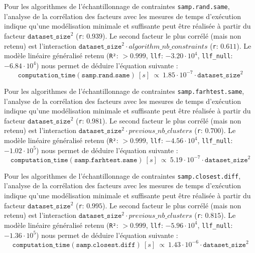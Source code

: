 			Pour les algorithmes de l'échantillonnage de contraintes \texttt{samp.rand.same}, l'analyse de la corrélation des facteurs avec les mesures de temps d'exécution indique qu'une modélisation minimale et suffisante peut être réalisée à partir du facteur $\texttt{dataset\_size}^{2}$ (\texttt{r}: $0.939$).
			Le second facteur le plus corrélé (mais non retenu) est l'interaction $\texttt{dataset\_size}^{2} \cdot algorithm\_nb\_constraints$ (\texttt{r}: $0.611$).
			Le modèle linéaire généralisé retenu (\texttt{R²}: $> 0.999$, \texttt{llf}: $-3.20 \cdot 10^{4}$, \texttt{llf\_null}: $-6.84 \cdot 10^{4}$) nous permet de déduire l'équation suivante :
			\begin{equation}
				\texttt{computation\_time}(\texttt{samp.rand.same})~[s]~
				\propto~1.85 \cdot 10^{-7} \cdot \texttt{dataset\_size}^{2}
			\end{equation}
			
			Pour les algorithmes de l'échantillonnage de contraintes \texttt{samp.farhtest.same}, l'analyse de la corrélation des facteurs avec les mesures de temps d'exécution indique qu'une modélisation minimale et suffisante peut être réalisée à partir du facteur $\texttt{dataset\_size}^{2}$ (\texttt{r}: $0.981$).
			Le second facteur le plus corrélé (mais non retenu) est l'interaction $\texttt{dataset\_size}^{2} \cdot previous\_nb\_clusters$ (\texttt{r}: $0.700$).
			Le modèle linéaire généralisé retenu (\texttt{R²}: $> 0.999$, \texttt{llf}: $-4.56 \cdot 10^{4}$, \texttt{llf\_null}: $-1.02 \cdot 10^{5}$) nous permet de déduire l'équation suivante :
			\begin{equation}
				\texttt{computation\_time}(\texttt{samp.farhtest.same})~[s]~
				\propto~5.19 \cdot 10^{-7} \cdot \texttt{dataset\_size}^{2}
			\end{equation}
			
			Pour les algorithmes de l'échantillonnage de contraintes \texttt{samp.closest.diff}, l'analyse de la corrélation des facteurs avec les mesures de temps d'exécution indique qu'une modélisation minimale et suffisante peut être réalisée à partir du facteur $\texttt{dataset\_size}^{2}$ (\texttt{r}: $0.995$).
			Le second facteur le plus corrélé (mais non retenu) est l'interaction $\texttt{dataset\_size}^{2} \cdot previous\_nb\_clusters$ (\texttt{r}: $0.815$).
			Le modèle linéaire généralisé retenu (\texttt{R²}: $> 0.999$, \texttt{llf}: $-5.96 \cdot 10^{4}$, \texttt{llf\_null}: $-1.36 \cdot 10^{5}$) nous permet de déduire l'équation suivante :
			\begin{equation}
				\texttt{computation\_time}(\texttt{samp.closest.diff})~[s]~
				\propto~1.43 \cdot 10^{-6} \cdot \texttt{dataset\_size}^{2}
			\end{equation}
			
